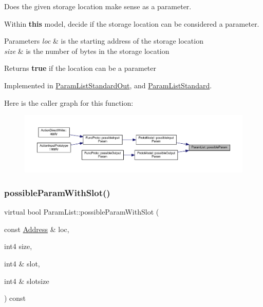 Does the given storage location make sense as a parameter. 

Within {\bfseries{this}} model, decide if the storage location can be considered a parameter. 
\begin{DoxyParams}{Parameters}
{\em loc} & is the starting address of the storage location \\
\hline
{\em size} & is the number of bytes in the storage location \\
\hline
\end{DoxyParams}
\begin{DoxyReturn}{Returns}
{\bfseries{true}} if the location can be a parameter 
\end{DoxyReturn}


Implemented in \mbox{\hyperlink{class_param_list_standard_out_a9c8b1c882536296945ff816d9e3f3600}{Param\+List\+Standard\+Out}}, and \mbox{\hyperlink{class_param_list_standard_a22a2afd938c503357fac9d330eb89858}{Param\+List\+Standard}}.

Here is the caller graph for this function\+:
\nopagebreak
\begin{figure}[H]
\begin{center}
\leavevmode
\includegraphics[width=350pt]{class_param_list_a77bf29c2bd3fe17be0e8200af97c50d9_icgraph}
\end{center}
\end{figure}
\mbox{\label{class_param_list_a612c46c0ba7aca424885c566b4c965fc}} 
\subsubsection{\texorpdfstring{possibleParamWithSlot()}{possibleParamWithSlot()}}
{\footnotesize\ttfamily virtual bool Param\+List\+::possible\+Param\+With\+Slot (\begin{DoxyParamCaption}\item[{const \mbox{\hyperlink{class_address}{Address}} \&}]{loc,  }\item[{int4}]{size,  }\item[{int4 \&}]{slot,  }\item[{int4 \&}]{slotsize }\end{DoxyParamCaption}) const\hspace{0.3cm}{\ttfamily [pure virtual]}}



